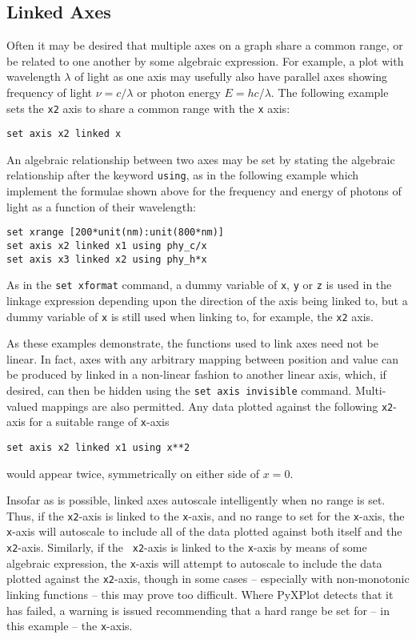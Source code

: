 \subsection{Linked Axes}
\label{sec:linked_axes}

Often it may be desired that multiple axes on a graph share a common range, or
be related to one another by some algebraic expression. For example, a plot
with wavelength $\lambda$ of light as one axis may usefully also have parallel
axes showing frequency of light $\nu=c/\lambda$ or photon energy
$E=hc/\lambda$. The following example sets the {\tt x2} axis to share a common
range with the {\tt x} axis:
\begin{verbatim}
set axis x2 linked x
\end{verbatim}
An algebraic relationship between two axes may be set by stating the algebraic
relationship after the keyword {\tt using}, as in the following example which
implement the formulae shown above for the frequency and energy of photons of
light as a function of their wavelength:
\begin{verbatim}
set xrange [200*unit(nm):unit(800*nm)]
set axis x2 linked x1 using phy_c/x
set axis x3 linked x2 using phy_h*x
\end{verbatim}
As in the {\tt set xformat} command, a dummy variable of {\tt x}, {\tt y} or
{\tt z} is used in the linkage expression depending upon the direction of the
axis being linked to, but a dummy variable of {\tt x} is still used when
linking to, for example, the {\tt x2} axis.

As these examples demonstrate, the functions used to link axes need not be
linear. In fact, axes with any arbitrary mapping between position and value can
be produced by linked in a non-linear fashion to another linear axis, which, if
desired, can then be hidden using the {\tt set axis invisible} command.
Multi-valued mappings are also permitted. Any data plotted against the
following {\tt x2}-axis for a suitable range of {\tt x}-axis
\begin{verbatim}
set axis x2 linked x1 using x**2
\end{verbatim}
would appear twice, symmetrically on either side of $x=0$.

Insofar as is possible, linked axes autoscale intelligently when no range is
set.  Thus, if the {\tt x2}-axis is linked to the {\tt x}-axis, and no range to
set for the {\tt x}-axis, the {\tt x}-axis will autoscale to include all of the
data plotted against both itself and the {\tt x2}-axis. Similarly, if the {\tt
x2}-axis is linked to the {\tt x}-axis by means of some algebraic expression,
the {\tt x}-axis will attempt to autoscale to include the data plotted against
the {\tt x2}-axis, though in some cases -- especially with non-monotonic
linking functions -- this may prove too difficult. Where PyXPlot detects that
it has failed, a warning is issued recommending that a hard range be set for --
in this example -- the {\tt x}-axis.

